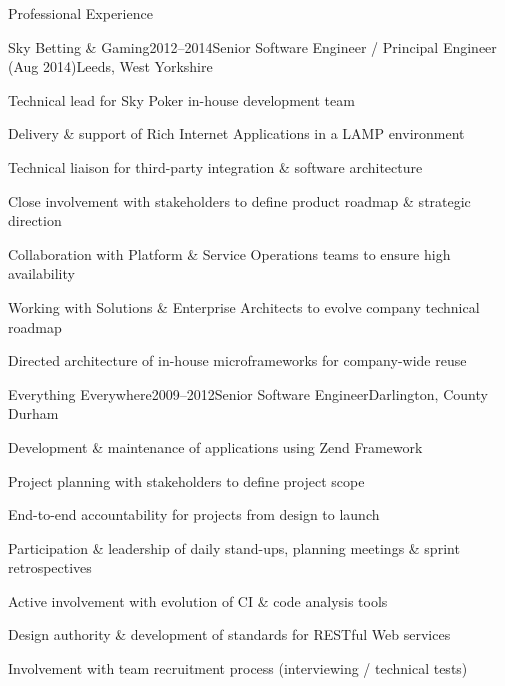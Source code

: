 \documentclass{cv}
\begin{document}
\begin{rSection}{Professional Experience}


\begin{rSubsection}{Sky Betting \& Gaming}{2012--2014}{Senior Software Engineer / Principal Engineer (Aug 2014)}{Leeds, West Yorkshire}
\item Technical lead for Sky Poker in-house development team
\item Delivery \& support of Rich Internet Applications in a LAMP environment
\item Technical liaison for third-party integration \& software architecture
\item Close involvement with stakeholders to define product roadmap \& strategic direction
\item Collaboration with Platform \& Service Operations teams to ensure high availability
\item Working with Solutions \& Enterprise Architects to evolve company technical roadmap
\item Directed architecture of in-house microframeworks for company-wide reuse
\end{rSubsection}


\begin{rSubsection}{Everything Everywhere}{2009--2012}{Senior Software Engineer}{Darlington, County Durham}
\item Development \& maintenance of applications using Zend Framework
\item Project planning with stakeholders to define project scope
\item End-to-end accountability for projects from design to launch
\item Participation \& leadership of daily stand-ups, planning meetings \& sprint retrospectives
\item Active involvement with evolution of CI \& code analysis tools
\item Design authority \& development of standards for RESTful Web services
\item Involvement with team recruitment process (interviewing / technical tests)
\end{rSubsection}



\end{rSection}
\end{document}
